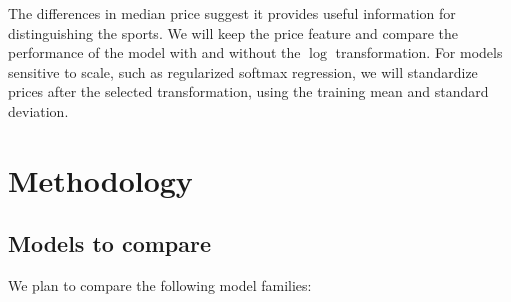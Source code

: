 \documentclass[12pt]{article}
\begin{document}
The differences in median price suggest it provides useful information for
distinguishing the sports. We will keep the price feature and compare the performance
of the model with and without the $\log$ transformation. For models sensitive to
scale, such as regularized softmax regression, we will standardize prices after
the selected transformation, using the training mean and standard deviation.

\section{Methodology}\label{sec:methodology}

\subsection{Models to compare}



We plan to compare the following model families:
\end{document}
